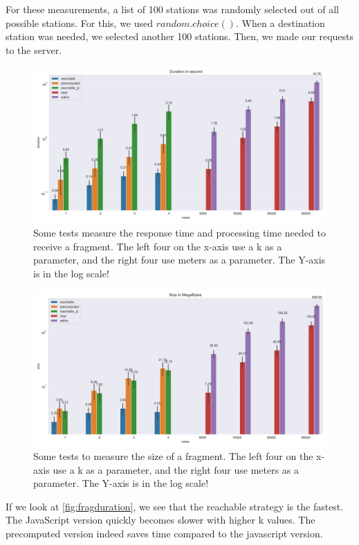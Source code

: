 For these measurements, a list of 100 stations was randomly selected out of all possible stations. For this, we used $random.choice()$. When a destination station was needed, we selected another 100 stations. Then, we made our requests to the server.

\begin{figure}[H]
    \centering
    \includegraphics[width=\textwidth]{images/fragmentsbyduration.png}
    \caption{Some tests measure the response time and processing time needed to receive a fragment. The left four on the x-axis use a k as a parameter, and the right four use meters as a parameter. The Y-axis is in the log scale!}
    \label{fig:fragduration}
\end{figure}
\begin{figure}[H]
    \centering
    \includegraphics[width=\textwidth]{images/fragmentsbysize.png}
    \caption{Some tests to measure the size of a fragment. The left four on the x-axis use a k as a parameter, and the right four use meters as a parameter. The Y-axis is in the log scale!}
    \label{fig:fragsize}
\end{figure}


If we look at \autoref{fig:fragduration}, we see that the reachable strategy is the fastest. The JavaScript version quickly becomes slower with higher k values. The precomputed version indeed saves time compared to the javascript version. 

